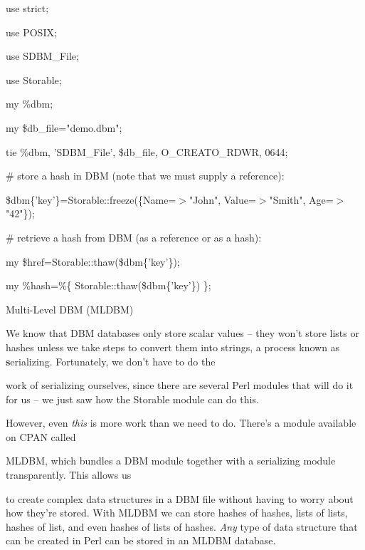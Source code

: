 \documentclass[a4paper,11pt]{book}
\begin{document}
\noindent use strict;

\noindent use POSIX;

\noindent 

\noindent 

\noindent use SDBM\_File;

\noindent use Storable;

\noindent 

\noindent my \%dbm;

\noindent my \$db\_file="demo.dbm";

\noindent 

\noindent tie \%dbm, 'SDBM\_File', \$db\_file, O\_CREAT\textbar O\_RDWR, 0644;

\noindent 

\noindent \# store a hash in DBM (note that we must supply a reference):

\noindent \$dbm\{'key'\}=Storable::freeze(\{Name=$>$"John", Value=$>$"Smith", Age=$>$"42"\});

\noindent 

\noindent \# retrieve a hash from DBM (as a reference or as a hash):

\noindent my \$href=Storable::thaw(\$dbm\{'key'\});

\noindent my \%hash=\%\{ Storable::thaw(\$dbm\{'key'\}) \};

\noindent 

\noindent 

\noindent Multi-Level DBM (MLDBM)

\noindent 

\noindent We know that DBM databases only store scalar values -- they won't store lists or hashes unless we take steps to convert them into strings, a process known as \textbf{s}erializing. Fortunately, we don't have to do the

\noindent work of serializing ourselves, since there are several Perl modules that will do it for us -- we just saw how the Storable module can do this.

\noindent 

\noindent However, even \textit{this }is more work than we need to do. There's a module available on CPAN called

\noindent MLDBM, which bundles a DBM module together with a serializing module transparently. This allows us

\noindent to create complex data structures in a DBM file without having to worry about how they're stored. With MLDBM we can store hashes of hashes, lists of lists, hashes of list, and even hashes of lists of hashes. \textit{Any }type of data structure that can be created in Perl can be stored in an MLDBM database.
\end{document}
